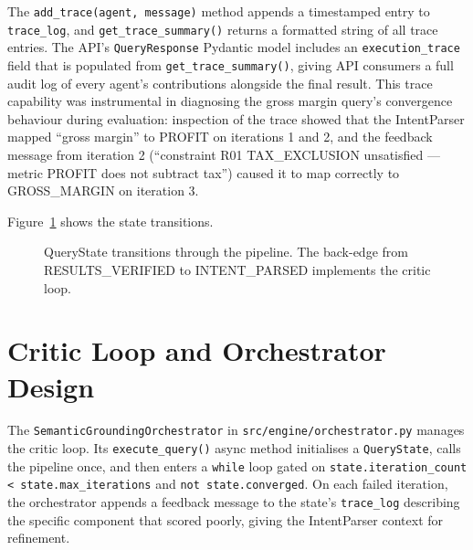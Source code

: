 \documentclass[12pt,a4paper]{report}
\begin{document}
The \texttt{add\_trace(agent, message)} method appends a timestamped entry to \texttt{trace\_log}, and \texttt{get\_trace\_summary()} returns a formatted string of all trace entries. The \ac{API}'s \texttt{QueryResponse} Pydantic model includes an \texttt{execution\_trace} field that is populated from \texttt{get\_trace\_summary()}, giving API consumers a full audit log of every agent's contributions alongside the final result. This trace capability was instrumental in diagnosing the gross margin query's convergence behaviour during evaluation: inspection of the trace showed that the IntentParser mapped ``gross margin'' to PROFIT on iterations 1 and 2, and the feedback message from iteration 2 (``constraint R01 TAX\_EXCLUSION unsatisfied — metric PROFIT does not subtract tax'') caused it to map correctly to GROSS\_MARGIN on iteration 3.

Figure~\ref{fig:statemachine} shows the state transitions.

\begin{figure}[H]
  \centering
  \caption{QueryState transitions through the pipeline. The back-edge from RESULTS\_VERIFIED to INTENT\_PARSED implements the critic loop.}
  \label{fig:statemachine}
\end{figure}

\section{Critic Loop and Orchestrator Design}
\label{sec:critic-loop}

The \texttt{SemanticGroundingOrchestrator} in \texttt{src/engine/orchestrator.py} manages the critic loop. Its \texttt{execute\_query()} async method initialises a \texttt{QueryState}, calls the pipeline once, and then enters a \texttt{while} loop gated on \texttt{state.iteration\_count < state.max\_iterations} and \texttt{not state.converged}. On each failed iteration, the orchestrator appends a feedback message to the state's \texttt{trace\_log} describing the specific component that scored poorly, giving the IntentParser context for refinement.
\end{document}
